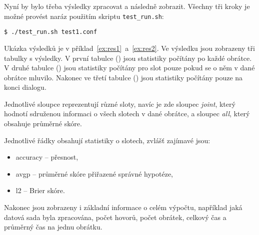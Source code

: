 Nyní by bylo třeba výsledky zpracovat a následně zobrazit.
Všechny tři kroky je možné provést naráz použitím skriptu \texttt{test\_run.sh}:

\begin{verbatim}
$ ./test_run.sh test1.conf
\end{verbatim}

Ukázka výsledků je v příklad~\ref{ex:res1}~a~\ref{ex:res2}. 
Ve výsledku jsou zobrazeny tři tabulky s výsledky. 
V první tabulce () jsou statistiky počítány po každé obrátce.
V druhé tabulce () jsou statistiky počítány pro slot pouze pokud se o něm v dané obrátce mluvilo.
Nakonec ve třetí tabulce () jsou statistiky počítány pouze na konci dialogu.

Jednotlivé sloupce reprezentují různé sloty, navíc je zde sloupec \emph{joint}, který hodnotí sdruženou informaci o všech slotech v dané obrátce, a sloupec \emph{all}, který obsahuje průměrné skóre.

Jednotlivé řádky obsahují statistiky o slotech, zvlášť zajímavé jsou:
\begin{itemize}
\item accuracy -- přesnost,
\item avgp -- průměrné skóre přiřazené správné hypotéze,
\item l2 -- Brier skóre.
\end{itemize}

Nakonec jsou zobrazeny i základní informace o celém výpočtu, například jaká datová sada byla zpracována, počet hovorů, počet obrátek, celkový čas a průměrný čas na jednu obrátku.

